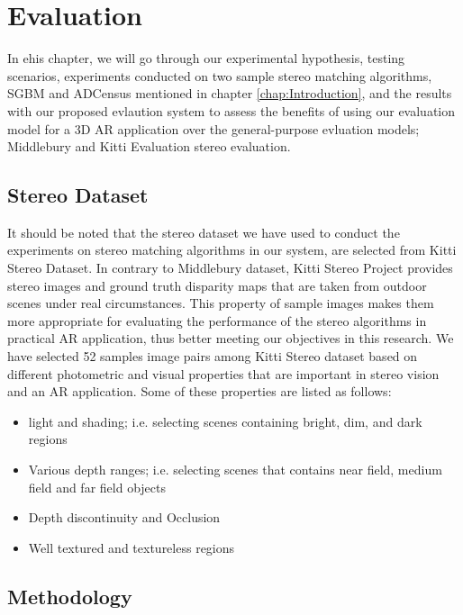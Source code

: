 \chapter{Evaluation}
\label{chap:Evaluation}
\renewcommand{\arraystretch}{0.5}

In ehis chapter, we will go through our experimental hypothesis, testing scenarios, experiments conducted on two sample 
stereo matching algorithms, SGBM and ADCensus mentioned in chapter \ref{chap:Introduction}, and the results with our
proposed evlaution system to assess the benefits of using our evaluation model for a 3D AR application over the general-purpose evluation models; 
Middlebury and Kitti Evaluation stereo evaluation.

\section{Stereo Dataset}
It should be noted that the stereo dataset we have used to conduct the experiments on stereo matching algorithms in our system,
are selected from Kitti Stereo Dataset.
In contrary to Middlebury dataset, Kitti Stereo Project provides stereo images and ground truth disparity maps
that are taken from outdoor scenes under real circumstances. This property of sample images makes them more appropriate 
for evaluating the performance of the stereo algorithms in practical AR application, thus better meeting our objectives in this research.
We have selected 52 samples image pairs among Kitti Stereo dataset based on different photometric and visual properties that are important
in stereo vision and an AR application. Some 
of these properties are listed as follows:
\begin{itemize}
\item light and shading; i.e. selecting scenes containing bright, dim, and dark regions
\item Various depth ranges; i.e. selecting scenes that contains near field, medium field and far field objects  
\item Depth discontinuity and Occlusion
\item Well textured and textureless regions
\end{itemize}


\section{Methodology}

